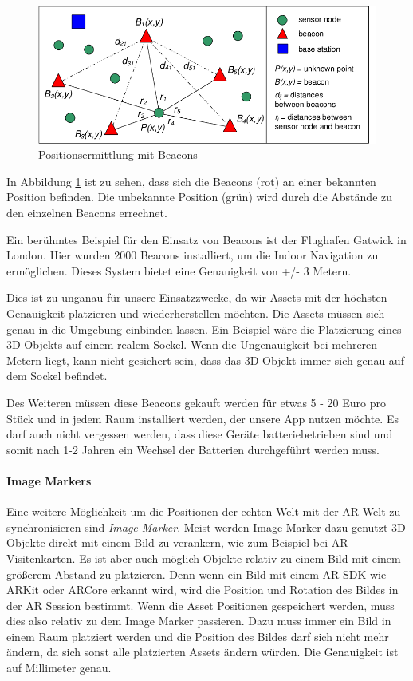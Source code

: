\documentclass[titlepage, a4paper, 11pt]{scrartcl}
\begin{document}
    \begin{figure}[h]
      \centering
      \includegraphics[width=.6\textwidth]{beacons}
      \caption{Positionsermittlung mit Beacons \cite{beaconNetwork}}
      \label{Beacons}
    \end{figure}

    In Abbildung \ref{Beacons} ist zu sehen, dass sich die Beacons (rot) an einer bekannten Position befinden. Die unbekannte Position (grün) wird durch die Abstände zu den einzelnen Beacons errechnet.

    Ein berühmtes Beispiel für den Einsatz von Beacons ist der Flughafen Gatwick in London. Hier wurden 2000 Beacons installiert, um die Indoor Navigation zu ermöglichen. \cite{GatwickA64:online} 
    Dieses System bietet eine Genauigkeit von +/- 3 Metern.
    
    Dies ist zu unganau für unsere Einsatzzwecke, da wir Assets mit der höchsten Genauigkeit platzieren und wiederherstellen möchten. Die Assets müssen sich genau in die Umgebung einbinden lassen.
    Ein Beispiel wäre die Platzierung eines 3D Objekts auf einem realem Sockel. Wenn die Ungenauigkeit bei mehreren Metern liegt, kann nicht gesichert sein, dass das 3D Objekt immer sich genau auf dem Sockel befindet.

    Des Weiteren müssen diese Beacons gekauft werden für etwas 5 - 20 Euro pro Stück und in jedem Raum installiert werden, der unsere App nutzen möchte.
    Es darf auch nicht vergessen werden, dass diese Geräte batteriebetrieben sind und somit nach 1-2 Jahren ein Wechsel der Batterien durchgeführt werden muss. 

    \paragraph{Image Markers}

    Eine weitere Möglichkeit um die Positionen der echten Welt mit der AR Welt zu synchronisieren sind \textit{Image Marker}. Meist werden Image Marker dazu genutzt 3D Objekte direkt mit einem Bild zu verankern, wie zum Beispiel bei AR Visitenkarten.
    Es ist aber auch möglich Objekte relativ zu einem Bild mit einem größerem Abstand zu platzieren. Denn wenn ein Bild mit einem AR SDK wie ARKit oder ARCore erkannt wird, wird die Position und Rotation des Bildes in der AR Session bestimmt.
    Wenn die Asset Positionen gespeichert werden, muss dies also relativ zu dem Image Marker passieren. Dazu muss immer ein Bild in einem Raum platziert werden und die Position des Bildes darf sich nicht mehr ändern, da sich sonst alle platzierten Assets ändern würden.
    Die Genauigkeit ist auf Millimeter genau. \cite{HowAugme98:online}
    
\end{document}
